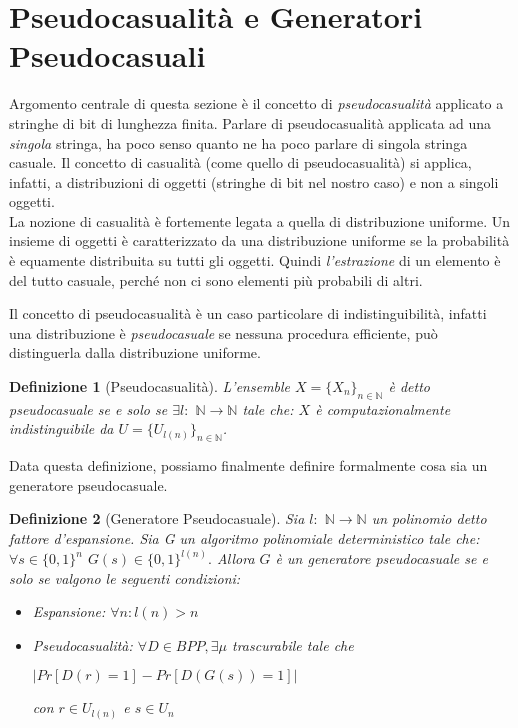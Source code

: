 \documentclass[a4paper,openright,twoside,12pt]{report}
\newtheorem{definizione}{Definizione}[chapter]
\begin{document}
\section{Pseudocasualit\`a e Generatori Pseudocasuali}
Argomento centrale di questa sezione \`e il concetto di \emph{pseudocasualit\`a} applicato a stringhe di bit di lunghezza finita.
Parlare di pseudocasualit\`a applicata ad una \emph{singola} stringa, ha poco senso quanto ne ha poco parlare di singola stringa casuale.
Il concetto di casualit\`a (come quello di pseudocasualit\`a) si applica, infatti, a distribuzioni di oggetti (stringhe di bit nel nostro caso) e non a singoli oggetti.\\
La nozione di casualit\`a \`e fortemente legata a quella di distribuzione uniforme. Un insieme di oggetti \`e caratterizzato
da una distribuzione uniforme se la probabilit\`a \`e equamente distribuita su tutti gli oggetti. Quindi \emph{l'estrazione} di un elemento \`e del tutto casuale, 
perch\'e non ci sono elementi pi\`u probabili di altri.

Il concetto di pseudocasualit\`a \`e un caso particolare di indistinguibilit\`a, infatti una distribuzione \`e \emph{pseudocasuale} se nessuna procedura efficiente, 
pu\`o distinguerla dalla distribuzione uniforme.
\begin{definizione}[Pseudocasualit\`a]
L'ensemble $X=\{X_n\}_{n \in \mathbb{N}}$ \`e detto pseudocasuale se e solo se $ \exists l:$ $\mathbb{N}\rightarrow\mathbb{N}$ tale che: 
$X$ \`e computazionalmente indistinguibile da $U=\{U_{l(n)}\}_{n \in \mathbb{N}} $.  
\end{definizione}
Data questa definizione, possiamo finalmente definire formalmente cosa sia un generatore pseudocasuale.
\begin{definizione}[Generatore Pseudocasuale]
Sia $l:$ $\mathbb{N}\rightarrow\mathbb{N}$ un polinomio detto fattore d'espansione. 
Sia G un algoritmo polinomiale deterministico tale che: $\forall s \in \{0, 1\}^{n}$ $G(s) \in \{0, 1\}^{l(n)}.$
Allora $G$ \`e un generatore pseudocasuale se e solo se valgono le seguenti condizioni:
\begin{itemize}
 \item Espansione: $\forall n: l(n) > n$
 \item Pseudocasualit\`a: $\forall D \in BPP, \exists \mu$ trascurabile tale che \begin{center}
                                                   $\lvert Pr[D(r) = 1] - Pr[D(G(s)) = 1]\rvert$                               
                                                                                 \end{center} 
con $r \in U_{l(n)}$ e $s \in U_{n}$
\end{itemize}
\end{definizione}
\end{document}
